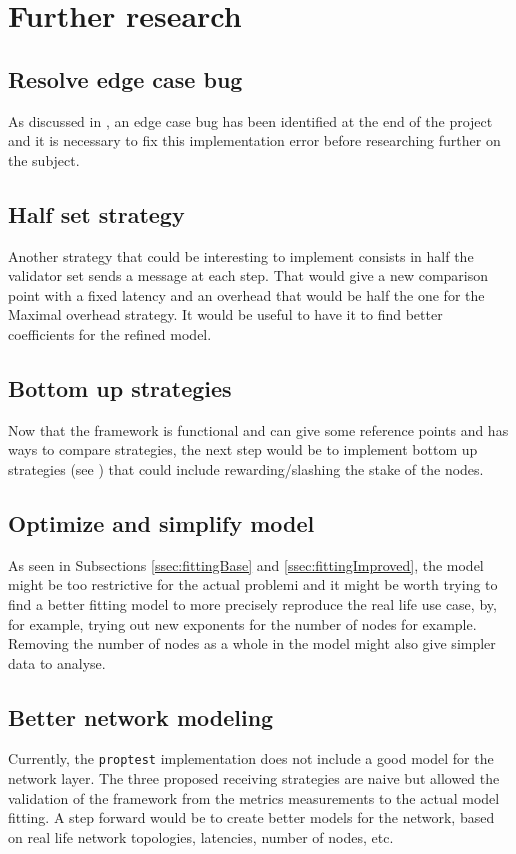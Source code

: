 \FloatBarrier
\section{Further research}
\subsection{Resolve edge case bug}
As discussed in , an edge case bug has been identified at
the end of the project and it is necessary to fix this implementation error
before researching further on the subject.

\subsection{Half set strategy}
Another strategy that could be interesting to implement consists in 
half the validator set sends a message at each step. That would give a new
comparison point with a fixed latency and an overhead that would be half the one
for the Maximal overhead strategy. It would be useful to have it to find better
coefficients for the refined model.

\subsection{Bottom up strategies}
Now that the framework is functional and can give some reference points and has
ways to compare strategies, the next step would be to implement bottom
up strategies (see ) that could include
rewarding/slashing the stake of the nodes.

\subsection{Optimize and simplify model}
As seen in Subsections \ref{ssec:fittingBase} and \ref{ssec:fittingImproved},
the model might be too restrictive for the actual problemi and it might be worth
trying to find a better fitting model to more precisely reproduce the real life
use case, by, for example, trying out new exponents for the number of nodes for
example. Removing the number of nodes as a whole in the model might also give
simpler data to analyse.

\subsection{Better network modeling}
Currently, the \texttt{proptest} implementation does not include a good model
for the network layer. The three proposed receiving strategies are naive but
allowed the validation of the framework from the metrics measurements to the actual
model fitting. A step forward would be to create better models for the
network, based on real life network topologies, latencies, number of nodes, etc.

